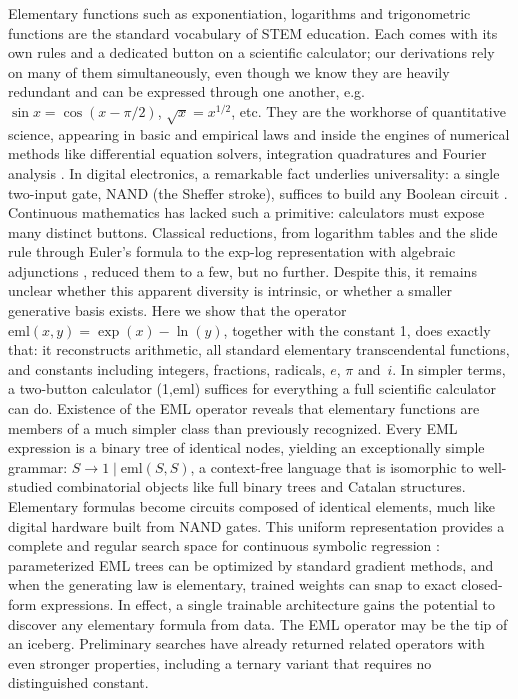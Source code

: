 \documentclass[12pt]{article}
\begin{document}
Elementary functions such as exponentiation, logarithms and trigonometric functions
are the standard vocabulary of STEM education. Each
comes with its own rules and a dedicated button on a scientific calculator;
our derivations rely on many of them simultaneously, even though we know they
are heavily redundant and can be expressed through one another, e.g. $\sin{x} = \cos(x-\pi/2)$, $\sqrt{x}=x^{1/2}$, etc. 
They are the workhorse of quantitative science, appearing in basic and empirical laws and inside the engines of numerical methods like differential equation solvers, integration quadratures and Fourier analysis \cite{NumericalRecipes}.
In digital electronics, a remarkable fact underlies universality: a single
two-input gate, NAND (the Sheffer stroke), suffices to build any Boolean
circuit \cite{Sheffer1913}. Continuous mathematics has lacked such a primitive: calculators must expose many distinct buttons. 
Classical reductions, from logarithm tables \cite{Napier,Briggs} and the slide rule through Euler's formula \cite{Cotes1722} to the exp-log
representation \cite{Liouville1835} with algebraic adjunctions \cite{Ritt1948}, reduced them to a few, but no further.
Despite this, it remains unclear whether this apparent diversity is intrinsic, or whether a smaller generative basis exists.
Here we show that the operator $\mathrm{eml}(x,y) = \exp(x) - \ln(y)$, together
with the constant 1, does exactly that: it reconstructs arithmetic, all
standard elementary transcendental functions, and constants including 
integers, fractions, radicals, $e$, $\pi$ and~$i$.
In simpler terms, a two-button calculator (1,eml) suffices for everything a full scientific
calculator can do. 
Existence of the EML operator reveals that elementary functions are members of a
much simpler class than previously recognized. Every EML expression is a binary
tree of identical nodes, yielding an exceptionally simple grammar:
$S \to 1 \mid \mathrm{eml}(S, S)$, a context-free language that is isomorphic
to well-studied combinatorial objects like full binary trees and Catalan structures. 
Elementary formulas become circuits \cite{Ulmann+2022} composed of identical elements, much like digital hardware built from NAND gates.
This uniform representation provides a complete and regular search space for
continuous symbolic regression \cite{udrescu2020ai,cranmer2020discovering}: parameterized EML trees can be optimized by standard
gradient methods, and when the generating law is elementary, trained weights
can snap to exact closed-form expressions. In effect, a single trainable
architecture gains the potential to discover \cite{liu2025kan} any elementary formula from data.
The EML operator may be the tip of an iceberg. Preliminary searches have
already returned related operators with even stronger properties, including a
ternary variant that requires no distinguished constant.
\end{document}
